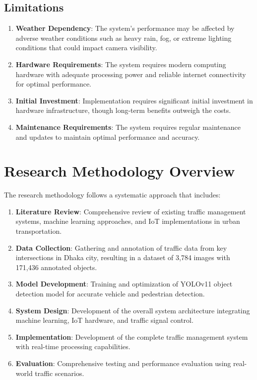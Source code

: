 \subsection{Limitations}

\begin{enumerate}
    \item \textbf{Weather Dependency}: The system's performance may be affected by adverse weather conditions such as heavy rain, fog, or extreme lighting conditions that could impact camera visibility.
    
    \item \textbf{Hardware Requirements}: The system requires modern computing hardware with adequate processing power and reliable internet connectivity for optimal performance.
    
    \item \textbf{Initial Investment}: Implementation requires significant initial investment in hardware infrastructure, though long-term benefits outweigh the costs.
    
    \item \textbf{Maintenance Requirements}: The system requires regular maintenance and updates to maintain optimal performance and accuracy.
\end{enumerate}

\section{Research Methodology Overview}

The research methodology follows a systematic approach that includes:

\begin{enumerate}
    \item \textbf{Literature Review}: Comprehensive review of existing traffic management systems, machine learning approaches, and IoT implementations in urban transportation.
    
    \item \textbf{Data Collection}: Gathering and annotation of traffic data from key intersections in Dhaka city, resulting in a dataset of 3,784 images with 171,436 annotated objects.
    
    \item \textbf{Model Development}: Training and optimization of YOLOv11 object detection model for accurate vehicle and pedestrian detection.
    
    \item \textbf{System Design}: Development of the overall system architecture integrating machine learning, IoT hardware, and traffic signal control.
    
    \item \textbf{Implementation}: Development of the complete traffic management system with real-time processing capabilities.
    
    \item \textbf{Evaluation}: Comprehensive testing and performance evaluation using real-world traffic scenarios.
\end{enumerate}

